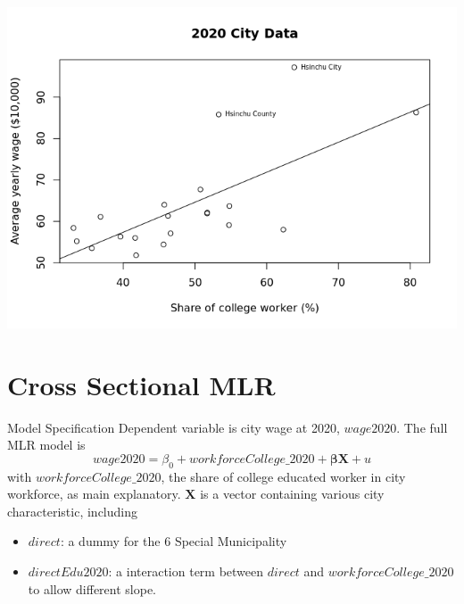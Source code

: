 \documentclass[compress]{beamer}
\begin{document}
\begin{frame}{}
  \includegraphics[width=\linewidth]{unnamed-chunk-13-1.png}
\end{frame}

\section[Cross Section]{Cross Sectional MLR}

\begin{frame}{Model Specification}
  Dependent variable is city wage at 2020, $wage2020$. The full MLR model is 
  \begin{equation}
    wage2020 = \beta_0 + workforceCollege\_2020 + \mathbf{\beta X} + u
  \end{equation}
  with $workforceCollege\_2020$, the share of college educated worker in city workforce, as main explanatory. $\mathbf{X}$ is a vector containing
  various city characteristic, including
  \begin{itemize}
    \item $direct$: a dummy for the 6 Special Municipality
    \item $directEdu2020$: a interaction term between $direct$ and $workforceCollege\_2020$ to allow different slope.
  \end{itemize}
\end{frame}
\end{document}
